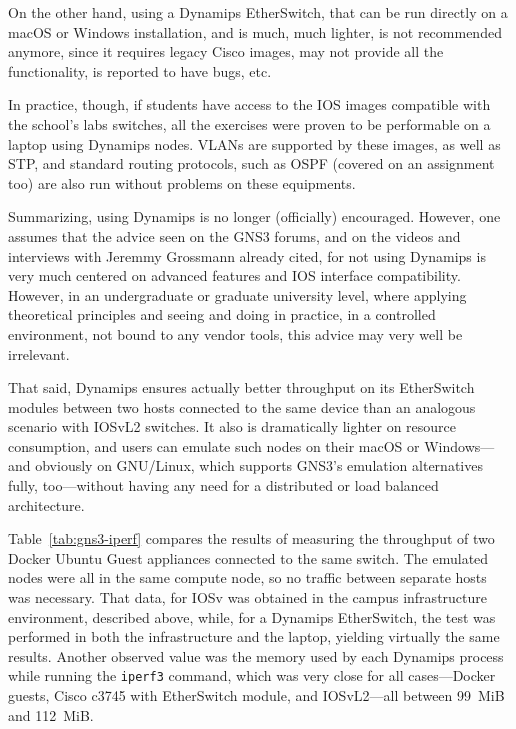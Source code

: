 On the other hand, using a Dynamips EtherSwitch, that can be run directly on a macOS or Windows installation, and is much, much lighter, is not recommended anymore, since it requires legacy Cisco images, may not provide all the functionality, is reported to have bugs, etc.

In practice, though, if students have access to the IOS images compatible with the school's labs switches, all the exercises were proven to be performable on a laptop using Dynamips nodes.
VLANs are supported by these images, as well as STP, and standard routing protocols, such as OSPF (covered on an assignment too) are also run without problems on these equipments.

Summarizing, using Dynamips is no longer (officially) encouraged.
However, one assumes that the advice seen on the GNS3 forums, and on the videos and interviews with Jeremmy Grossmann already cited, for not using Dynamips is very much centered on advanced features and IOS interface compatibility.
However, in an undergraduate or graduate university level, where applying theoretical principles and seeing and doing in practice, in a controlled environment, not bound to any vendor tools, this advice may very well be irrelevant.



That said, Dynamips ensures actually better throughput on its EtherSwitch modules between two hosts connected to the same device than an analogous scenario with IOSvL2 switches.
It also is dramatically lighter on resource consumption, and users can emulate such nodes on their macOS or Windows---and obviously on GNU/Linux, which supports GNS3's emulation alternatives fully, too---without having any need for a distributed or load balanced architecture.

Table~\ref{tab:gns3-iperf} compares the results of measuring the throughput of two Docker Ubuntu Guest appliances connected to the same switch.
The emulated nodes were all in the same compute node, so no traffic between separate hosts was necessary.
That data, for IOSv was obtained in the campus infrastructure environment, described above, while, for a Dynamips EtherSwitch, the test was performed in both the infrastructure and the laptop, yielding virtually the same results.
Another observed value was the memory used by each Dynamips process while running the \texttt{iperf3} command, which was very close for all cases---Docker guests, Cisco c3745 with EtherSwitch module, and IOSvL2---all between 99~MiB and 112~MiB.

